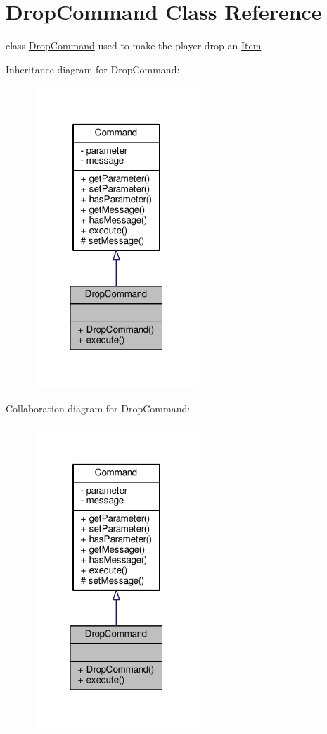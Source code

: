 \hypertarget{classDropCommand}{\section{Drop\-Command Class Reference}
\label{classDropCommand}
}


class \hyperlink{classDropCommand}{Drop\-Command} used to make the player drop an \hyperlink{classItem}{Item}  




Inheritance diagram for Drop\-Command\-:
\nopagebreak
\begin{figure}[H]
\begin{center}
\leavevmode
\includegraphics[width=176pt]{classDropCommand__inherit__graph}
\end{center}
\end{figure}


Collaboration diagram for Drop\-Command\-:
\nopagebreak
\begin{figure}[H]
\begin{center}
\leavevmode
\includegraphics[width=176pt]{classDropCommand__coll__graph}
\end{center}
\end{figure}
